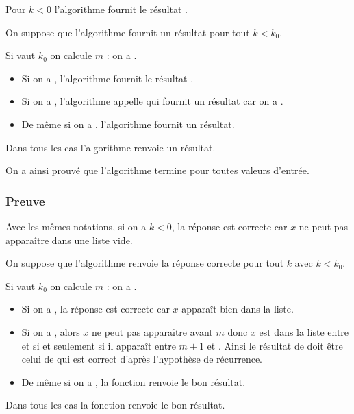 Pour $k < 0$ l'algorithme fournit le résultat .
  
On suppose que l'algorithme fournit un résultat pour tout $k < k_0$.
  
  Si  vaut $k_0$ on calcule $m$ : on a .
  
  \begin{itemize}
     \item Si on a , l'algorithme fournit le résultat .
     \item Si on a , l'algorithme appelle  qui fournit un résultat car on a 
     .
     \item De même si on a , l'algorithme fournit un résultat.
   \end{itemize} 
   Dans tous les cas l'algorithme renvoie un résultat.
   
   On a ainsi prouvé que l'algorithme termine pour toutes valeurs d'entrée.
\subsubsection{Preuve}
Avec les mêmes notations, si on a $k < 0$, la réponse  est correcte car $x$ ne peut pas apparaître dans une liste vide.

On suppose que l'algorithme renvoie la réponse correcte pour tout $k$ avec $k < k_0$.

Si  vaut $k_0$ on calcule $m$ : on a .
  
  \begin{itemize}
     \item Si on a , la réponse  est correcte car $x$ apparaît bien dans la liste.
     \item Si on a , alors $x$ ne peut pas apparaître avant $m$ donc $x$ est dans la liste entre  et  si et seulement si il apparaît entre $m+1$ et . Ainsi le résultat de  doit être celui de  qui est correct d'après l'hypothèse de récurrence.
     \item De même si on a , la fonction renvoie le bon résultat.
   \end{itemize} 
   Dans tous les cas la fonction renvoie le bon résultat.
